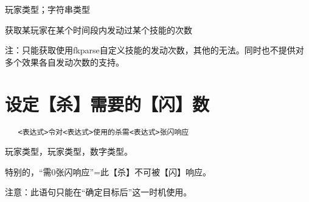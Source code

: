 玩家类型；字符串类型

获取某玩家在某个时间段内发动过某个技能的次数

注：只能获取使用fkparse自定义技能的发动次数，其他的无法。同时也不提供对多个效果各自发动次数的支持。

\section{设定【杀】需要的【闪】数}

\begin{verbatim}
   <表达式>令对<表达式>使用的杀需<表达式>张闪响应
\end{verbatim}

玩家类型，玩家类型，数字类型。

特别的，“需0张闪响应”=此【杀】不可被【闪】响应。

注意：此语句只能在“确定目标后”这一时机使用。